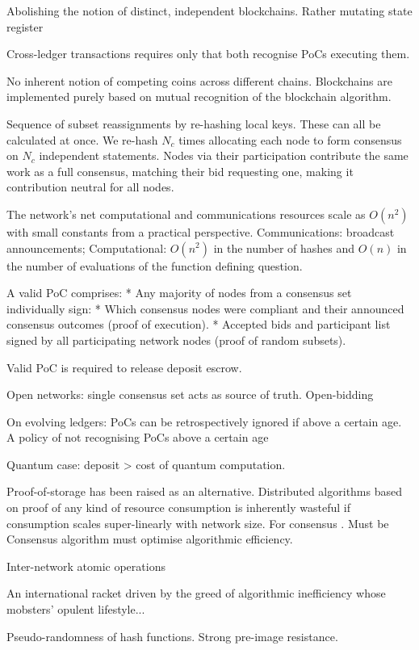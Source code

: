 Abolishing the notion of distinct, independent blockchains. Rather mutating state register

Cross-ledger transactions requires only that both recognise PoCs executing them.

No inherent notion of competing coins across different chains. Blockchains are implemented purely based on mutual recognition of the blockchain algorithm.

Sequence of subset reassignments by re-hashing local keys. These can all be calculated at once. We re-hash $N_c$ times allocating each node to form consensus on $N_c$ independent statements. Nodes via their participation contribute the same work as a full consensus, matching their bid requesting one, making it contribution neutral for all nodes.

The network's net computational and communications resources scale as $O(n^2)$ with small constants from a practical perspective. Communications: broadcast announcements; Computational: $O(n^2)$ in the number of hashes and $O(n)$ in the number of evaluations of the function defining question.

A valid PoC comprises:
* Any majority of nodes from a consensus set individually sign:
* Which consensus nodes were compliant and their announced consensus outcomes (proof of execution).
* Accepted bids and participant list signed by all participating network nodes (proof of random subsets).

Valid PoC is required to release deposit escrow.

Open networks: single consensus set acts as source of truth.
Open-bidding

On evolving ledgers:
PoCs can be retrospectively ignored if above a certain age.
A policy of not recognising PoCs above a certain age

Quantum case: deposit > cost of quantum computation.

Proof-of-storage has been raised as an alternative. Distributed algorithms based on proof of any kind of resource consumption is inherently wasteful if consumption scales super-linearly with network size. For consensus . Must be
Consensus algorithm must optimise algorithmic efficiency.

Inter-network atomic operations

An international racket driven by the greed of algorithmic inefficiency whose mobsters' opulent lifestyle...

Pseudo-randomness of hash functions.
Strong pre-image resistance.

